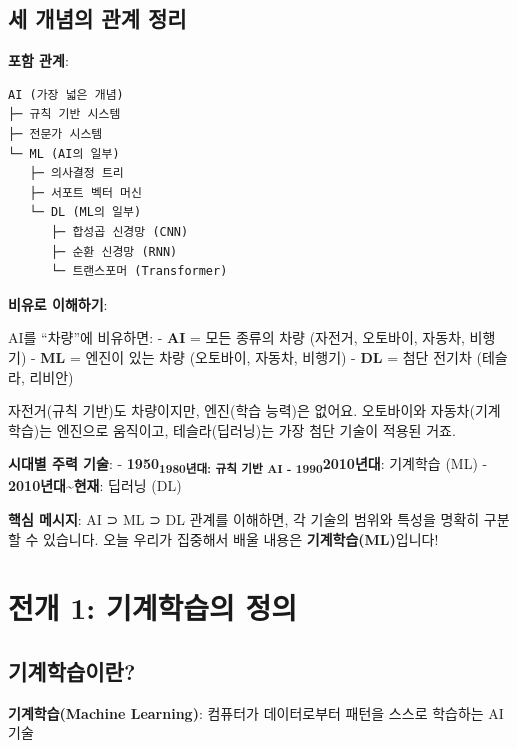 \documentclass[a4paper, 11pt]{article}
\renewenvironment{quote}
  {\begin{tcolorbox}[colback=lightblue!30, colframe=mainblue!50,
   left=8pt, right=8pt, top=4pt, bottom=4pt, breakable]}
  {\end{tcolorbox}}
\begin{document}
\hypertarget{uxc138-uxac1cuxb150uxc758-uxad00uxacc4-uxc815uxb9ac}{%
\subsection{세 개념의 관계
정리}\label{uxc138-uxac1cuxb150uxc758-uxad00uxacc4-uxc815uxb9ac}}

\textbf{포함 관계}:

\begin{verbatim}
AI (가장 넓은 개념)
├─ 규칙 기반 시스템
├─ 전문가 시스템
└─ ML (AI의 일부)
   ├─ 의사결정 트리
   ├─ 서포트 벡터 머신
   └─ DL (ML의 일부)
      ├─ 합성곱 신경망 (CNN)
      ├─ 순환 신경망 (RNN)
      └─ 트랜스포머 (Transformer)
\end{verbatim}

\textbf{비유로 이해하기}:

AI를 ``차량''에 비유하면: - \textbf{AI} = 모든 종류의 차량 (자전거,
오토바이, 자동차, 비행기) - \textbf{ML} = 엔진이 있는 차량 (오토바이,
자동차, 비행기) - \textbf{DL} = 첨단 전기차 (테슬라, 리비안)

자전거(규칙 기반)도 차량이지만, 엔진(학습 능력)은 없어요. 오토바이와
자동차(기계학습)는 엔진으로 움직이고, 테슬라(딥러닝)는 가장 첨단 기술이
적용된 거죠.

\textbf{시대별 주력 기술}: -
\textbf{1950\textsubscript{1980년대\textbf{: 규칙 기반 AI -
}1990}2010년대}: 기계학습 (ML) - \textbf{2010년대\textasciitilde 현재}:
딥러닝 (DL)

\begin{quote}
 \textbf{핵심 메시지}: AI ⊃ ML ⊃ DL 관계를 이해하면, 각 기술의 범위와
특성을 명확히 구분할 수 있습니다. 오늘 우리가 집중해서 배울 내용은
\textbf{기계학습(ML)}입니다!
\end{quote}

\hypertarget{uxc804uxac1c-1-uxae30uxacc4uxd559uxc2b5uxc758-uxc815uxc758}{%
\section{ 전개 1: 기계학습의
정의}\label{uxc804uxac1c-1-uxae30uxacc4uxd559uxc2b5uxc758-uxc815uxc758}}

\hypertarget{uxae30uxacc4uxd559uxc2b5uxc774uxb780}{%
\subsection{기계학습이란?}\label{uxae30uxacc4uxd559uxc2b5uxc774uxb780}}

\begin{quote}
\textbf{기계학습(Machine Learning)}: 컴퓨터가 데이터로부터 패턴을 스스로
학습하는 AI 기술
\end{quote}
\end{document}
